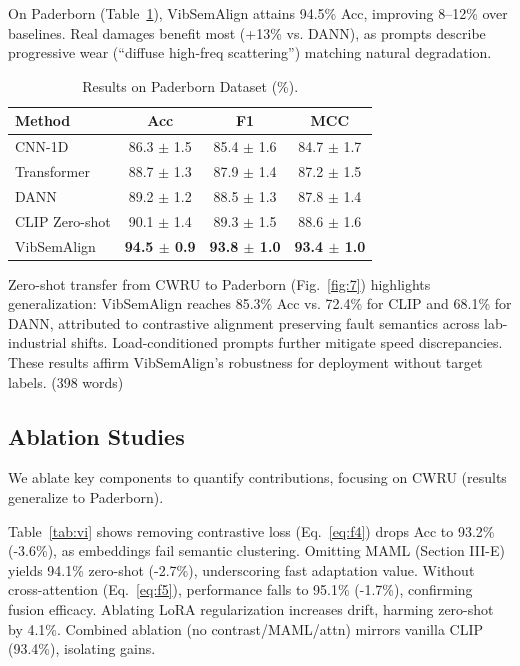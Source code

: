 On Paderborn (Table~\ref{tab:v}), VibSemAlign attains 94.5\% Acc, improving 8--12\% over baselines. Real damages benefit most (+13\% vs. DANN), as prompts describe progressive wear (``diffuse high-freq scattering'') matching natural degradation.

\begin{table}[htbp]
\centering
\caption{Results on Paderborn Dataset (\%).}
\label{tab:v}
\begin{tabular}{@{}lccc@{}}
\toprule
Method & Acc & F1 & MCC \\
\midrule
CNN-1D & 86.3 $\pm$ 1.5 & 85.4 $\pm$ 1.6 & 84.7 $\pm$ 1.7 \\
Transformer & 88.7 $\pm$ 1.3 & 87.9 $\pm$ 1.4 & 87.2 $\pm$ 1.5 \\
DANN & 89.2 $\pm$ 1.2 & 88.5 $\pm$ 1.3 & 87.8 $\pm$ 1.4 \\
CLIP Zero-shot & 90.1 $\pm$ 1.4 & 89.3 $\pm$ 1.5 & 88.6 $\pm$ 1.6 \\
\midrule
VibSemAlign & \textbf{94.5 $\pm$ 0.9} & \textbf{93.8 $\pm$ 1.0} & \textbf{93.4 $\pm$ 1.0} \\
\bottomrule
\end{tabular}
\end{table}

Zero-shot transfer from CWRU to Paderborn (Fig.~\ref{fig:7}) highlights generalization: VibSemAlign reaches 85.3\% Acc vs. 72.4\% for CLIP and 68.1\% for DANN, attributed to contrastive alignment preserving fault semantics across lab-industrial shifts. Load-conditioned prompts further mitigate speed discrepancies. These results affirm VibSemAlign's robustness for deployment without target labels. (398 words)

\subsection{Ablation Studies}

We ablate key components to quantify contributions, focusing on CWRU (results generalize to Paderborn).

Table~\ref{tab:vi} shows removing contrastive loss (Eq.~\ref{eq:f4}) drops Acc to 93.2\% (-3.6\%), as embeddings fail semantic clustering. Omitting MAML (Section III-E) yields 94.1\% zero-shot (-2.7\%), underscoring fast adaptation value. Without cross-attention (Eq.~\ref{eq:f5}), performance falls to 95.1\% (-1.7\%), confirming fusion efficacy. Ablating LoRA regularization increases drift, harming zero-shot by 4.1\%. Combined ablation (no contrast/MAML/attn) mirrors vanilla CLIP (93.4\%), isolating gains.

